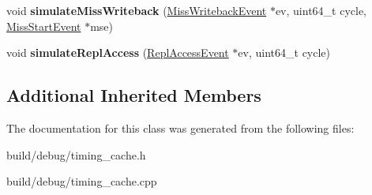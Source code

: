\begin{DoxyCompactItemize}
\item 
\hypertarget{classTimingCache_a34fb792dcc77dfe79ba6728742748826}{void {\bfseries simulate\-Miss\-Writeback} (\hyperlink{classMissWritebackEvent}{Miss\-Writeback\-Event} $\ast$ev, uint64\-\_\-t cycle, \hyperlink{classMissStartEvent}{Miss\-Start\-Event} $\ast$mse)}\label{classTimingCache_a34fb792dcc77dfe79ba6728742748826}

\item 
\hypertarget{classTimingCache_a7f073cf69fdac72bad8441c8bc5c3d62}{void {\bfseries simulate\-Repl\-Access} (\hyperlink{classReplAccessEvent}{Repl\-Access\-Event} $\ast$ev, uint64\-\_\-t cycle)}\label{classTimingCache_a7f073cf69fdac72bad8441c8bc5c3d62}

\end{DoxyCompactItemize}
\subsection*{Additional Inherited Members}


The documentation for this class was generated from the following files\-:\begin{DoxyCompactItemize}
\item 
build/debug/timing\-\_\-cache.\-h\item 
build/debug/timing\-\_\-cache.\-cpp\end{DoxyCompactItemize}
